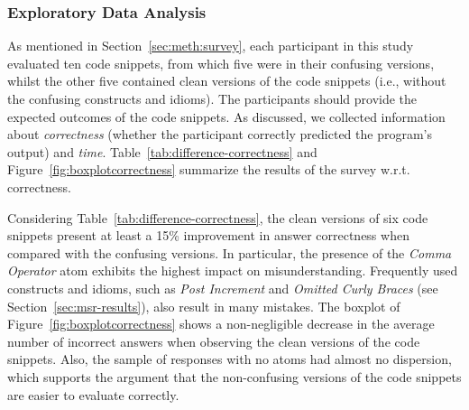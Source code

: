 \subsubsection*{Exploratory Data Analysis}

As mentioned in Section~\ref{sec:meth:survey}, each participant in this study evaluated ten code snippets, from which five were in their confusing versions, whilst the other five contained clean versions of the code snippets (i.e., without the confusing constructs and idioms). The participants should provide the expected outcomes of the code snippets. As discussed, we collected information about \emph{correctness} (whether the participant correctly predicted the program's output) and \emph{time}. 
Table~\ref{tab:difference-correctness} and Figure~\ref{fig:boxplotcorrectness} summarize the results of the survey w.r.t. correctness.

Considering Table~\ref{tab:difference-correctness}, the clean versions of six code snippets present at least a 15\% improvement in answer correctness when compared with the confusing versions. In particular, the presence of the \emph{Comma Operator} atom exhibits the highest impact on misunderstanding. 
Frequently used constructs and idioms, such as \emph{Post Increment} and \emph{Omitted Curly Braces} (see Section~\ref{sec:msr-results}), also result in many mistakes. %
The boxplot of Figure~\ref{fig:boxplotcorrectness} shows a non-negligible decrease in the average number of incorrect answers when observing the clean versions of the code snippets. Also, the sample of responses with no atoms had almost no dispersion, which supports the argument that the non-confusing versions of the code snippets are easier to evaluate correctly. 


